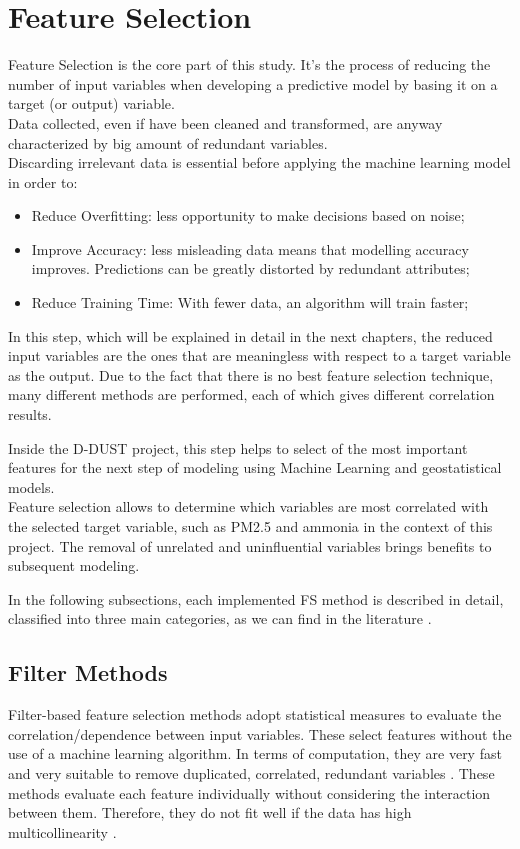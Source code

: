 \section{Feature Selection}
Feature Selection is the core part of this study. It's the process of reducing the number of input variables when developing a predictive model by basing it on a target (or output) variable. \\
Data collected, even if have been cleaned and transformed, are anyway characterized by big amount of redundant variables.\\
Discarding irrelevant data is essential before applying the machine learning model in order to:
\begin{itemize}
\item Reduce Overfitting: less opportunity to make decisions based on noise;
\item Improve Accuracy: less misleading data means that modelling accuracy improves. Predictions can be greatly distorted by redundant attributes;
\item Reduce Training Time: With fewer data, an algorithm will train faster;
\end{itemize}
In this step, which will be explained in detail in the next chapters, the reduced input variables are the ones that are meaningless with respect to a target variable as the output. \newline
Due to the fact that there is no best feature selection technique, many different methods are performed, each of which gives different correlation results.\par
Inside the D-DUST project, this step helps to select of the most important features for the next step of modeling using Machine Learning and geostatistical models. \\
Feature selection allows to determine which variables are most correlated with the selected target variable, such as PM2.5 and ammonia in the context of this project. 
The removal of unrelated and uninfluential variables brings benefits to subsequent modeling.
\par
In the following subsections, each implemented FS method is described in detail, classified into three main categories, as we can find in the literature \cite{stanczyk2015feature}.
\subsection{Filter Methods}
Filter-based feature selection methods adopt statistical measures to evaluate the correlation/dependence between input variables.\newline
These select features without the use of a machine learning algorithm. In terms of computation, they are very fast and very suitable to remove duplicated, correlated, redundant variables \cite{saeys2007review}. \newline
These methods evaluate each feature individually without considering the interaction between them. Therefore, they do not fit well if the data has high multicollinearity \cite{daoud2017multicollinearity}.

